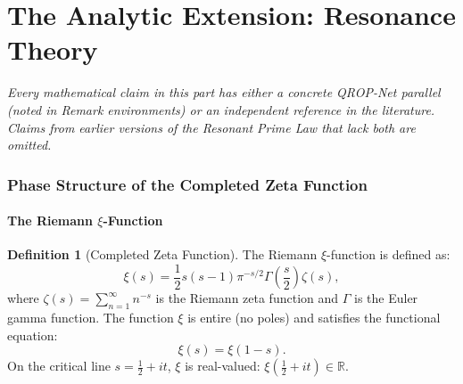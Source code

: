 \documentclass[11pt, a4paper]{article}
\theoremstyle{definition}
\newtheorem{definition}{Definition}[section]
\theoremstyle{plain}
\newcommand{\xif}{\xi}                      %
\begin{document}

\part{The Analytic Extension: Resonance Theory}
\label{part:resonance}

\vspace{0.5em}
\noindent\textit{Every mathematical claim in this part has either a
concrete QROP-Net parallel (noted in Remark environments) or an
independent reference in the literature. Claims from earlier versions
of the Resonant Prime Law that lack both are omitted.}
\vspace{0.5em}


\section{Phase Structure of the Completed Zeta Function}
\label{sec:xi_phase}

\subsection{The Riemann $\xif$-Function}

\begin{definition}[Completed Zeta Function]
\label{def:xi}
The Riemann $\xif$-function is defined as:
\begin{equation}
  \xif(s) = \frac{1}{2}s(s-1)\pi^{-s/2}\Gamma\!\left(\frac{s}{2}\right)\zeta(s),
  \label{eq:xi_def}
\end{equation}
where $\zeta(s) = \sum_{n=1}^{\infty}n^{-s}$ is the Riemann zeta function
and $\Gamma$ is the Euler gamma function. The function $\xif$ is entire (no
poles) and satisfies the functional equation:
\begin{equation}
  \xif(s) = \xif(1-s).
  \label{eq:func_eq}
\end{equation}
On the critical line $s = \tfrac{1}{2} + it$, $\xif$ is real-valued:
$\xif(\tfrac{1}{2}+it) \in \mathbb{R}$.
\end{definition}
\end{document}
